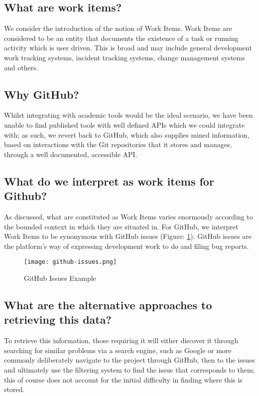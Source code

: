 
\subsection{What are work items?}

We consider the introduction of the notion of Work Items. Work Items are considered to be an entity that documents the existence of a task or running activity which is user driven. This is broad and may include general development work tracking systems, incident tracking systems, change management systems and others.

\subsection{Why GitHub?}

Whilst integrating with academic tools would be the ideal scenario, we have been unable to find published tools with well defined APIs which we could integrate with; as such, we revert back to GitHub, which also supplies mined information, based on interactions with the Git repositories that it stores and manages, through a well documented, accessible API.

\subsection{What do we interpret as work items for Github?}

As discussed, what are constituted as Work Items varies enormously according to the bounded context in which they are situated in. For GitHub, we interpret Work Items to be synonymous with GitHub issues (Figure: \ref{fig:githubIssuesExample}). GitHub issues are the platform's way of expressing development work to do and filing bug reports.

\begin{figure}[h!]
	\centering
	\texttt{[image: github-issues.png]}
	\label{fig:githubIssuesExample}
	\caption{GitHub Issues Example}

\end{figure}

\subsection{What are the alternative approaches to retrieving this data?}

To retrieve this information, those requiring it will either discover it through searching for similar problems via a search engine, such as Google or more commonly deliberately navigate to the project through GitHub, then to the issues and ultimately use the filtering system to find the issue that corresponds to them; this of course does not account for the initial difficulty in finding where this is stored.

